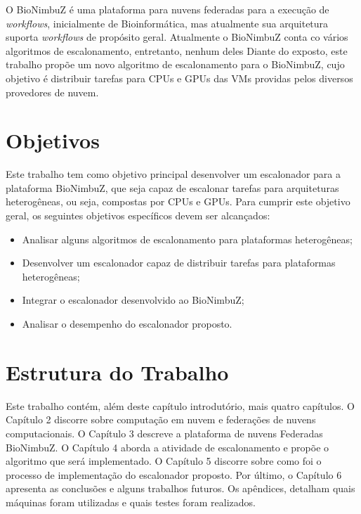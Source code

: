 O BioNimbuZ é uma plataforma para nuvens federadas para a execução de \textit{workflows}, inicialmente de Bioinformática, mas atualmente sua arquitetura suporta \textit{workflows} de propósito geral. Atualmente o BioNimbuZ conta co vários algoritmos de escalonamento, entretanto, nenhum deles  Diante do exposto, este trabalho propõe um novo algoritmo de escalonamento para o BioNimbuZ, cujo objetivo é distribuir tarefas para \acrshort{CPU}s e \acrshort{GPU}s das \acrshort{VM}s providas pelos diversos provedores de nuvem.


\section{Objetivos}
Este trabalho tem como objetivo principal desenvolver um escalonador para a plataforma BioNimbuZ, que seja capaz de escalonar tarefas para arquiteturas heterogêneas, ou seja, compostas por \acrshort{CPU}s e \acrshort{GPU}s. Para cumprir este objetivo geral, os seguintes objetivos específicos devem ser alcançados: 

\begin{itemize}
	\item Analisar alguns algoritmos de escalonamento para plataformas heterogêneas;
	\item Desenvolver um escalonador capaz de distribuir tarefas para plataformas heterogêneas;
	\item Integrar o escalonador desenvolvido ao BioNimbuZ;
	\item Analisar o desempenho do escalonador proposto.
\end{itemize}

\section{Estrutura do Trabalho}
Este trabalho contém, além deste capítulo introdutório, mais quatro capítulos. O Capítulo 2 discorre sobre computação em nuvem e federações de nuvens computacionais. O Capítulo 3 descreve a plataforma de nuvens Federadas BioNimbuZ. O Capítulo 4 aborda a atividade de escalonamento e propõe o algoritmo que será implementado. O Capítulo 5 discorre sobre como foi o processo de implementação do escalonador proposto. Por último, o Capítulo 6 apresenta as conclusões e alguns trabalhos futuros. Os apêndices, detalham quais máquinas foram utilizadas e quais testes foram realizados.